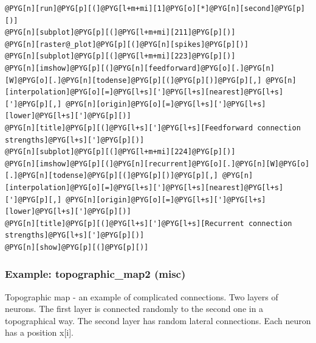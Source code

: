 \documentclass[letterpaper,10pt,english]{manual}
\begin{document}
\begin{Verbatim}[commandchars=@\[\]]
@PYG[n][run]@PYG[p][(]@PYG[l+m+mi][1]@PYG[o][*]@PYG[n][second]@PYG[p][)]
@PYG[n][subplot]@PYG[p][(]@PYG[l+m+mi][211]@PYG[p][)]
@PYG[n][raster@_plot]@PYG[p][(]@PYG[n][spikes]@PYG[p][)]
@PYG[n][subplot]@PYG[p][(]@PYG[l+m+mi][223]@PYG[p][)]
@PYG[n][imshow]@PYG[p][(]@PYG[n][feedforward]@PYG[o][.]@PYG[n][W]@PYG[o][.]@PYG[n][todense]@PYG[p][(]@PYG[p][)]@PYG[p][,] @PYG[n][interpolation]@PYG[o][=]@PYG[l+s][']@PYG[l+s][nearest]@PYG[l+s][']@PYG[p][,] @PYG[n][origin]@PYG[o][=]@PYG[l+s][']@PYG[l+s][lower]@PYG[l+s][']@PYG[p][)]
@PYG[n][title]@PYG[p][(]@PYG[l+s][']@PYG[l+s][Feedforward connection strengths]@PYG[l+s][']@PYG[p][)]
@PYG[n][subplot]@PYG[p][(]@PYG[l+m+mi][224]@PYG[p][)]
@PYG[n][imshow]@PYG[p][(]@PYG[n][recurrent]@PYG[o][.]@PYG[n][W]@PYG[o][.]@PYG[n][todense]@PYG[p][(]@PYG[p][)]@PYG[p][,] @PYG[n][interpolation]@PYG[o][=]@PYG[l+s][']@PYG[l+s][nearest]@PYG[l+s][']@PYG[p][,] @PYG[n][origin]@PYG[o][=]@PYG[l+s][']@PYG[l+s][lower]@PYG[l+s][']@PYG[p][)]
@PYG[n][title]@PYG[p][(]@PYG[l+s][']@PYG[l+s][Recurrent connection strengths]@PYG[l+s][']@PYG[p][)]
@PYG[n][show]@PYG[p][(]@PYG[p][)]
\end{Verbatim}

\resetcurrentobjects
\hypertarget{--doc-examples-misc_topographic_map2}{}

\hypertarget{index-71}{}\subsubsection{Example: topographic\_map2 (misc)}

Topographic map - an example of complicated connections.
Two layers of neurons.
The first layer is connected randomly to the second one in a
topographical way.
The second layer has random lateral connections.
Each neuron has a position x{[}i{]}.
\end{document}
